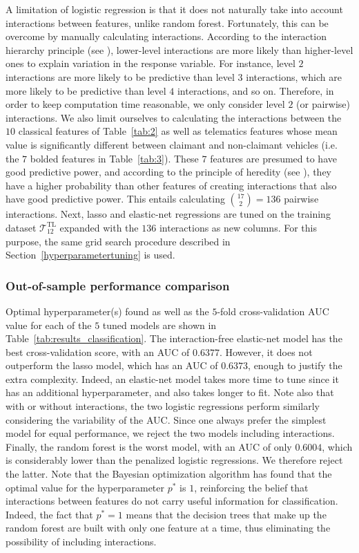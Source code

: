\documentclass{article}
\begin{document}
A limitation of logistic regression is that it does not naturally take into account interactions between features, unlike random forest. Fortunately, this can be overcome by manually calculating interactions. According to the interaction hierarchy principle (see \cite{kuhn2019feature}), lower-level interactions are more likely than higher-level ones to explain variation in the response variable. For instance, level $2$ interactions are more likely to be predictive than level $3$ interactions, which are more likely to be predictive than level $4$ interactions, and so on. Therefore, in order to keep computation time reasonable, we only consider level $2$ (or pairwise) interactions. We also limit ourselves to calculating the interactions between the $10$ classical features of Table~\ref{tab:2} as well as telematics features whose mean value is significantly different between claimant and non-claimant vehicles (i.e. the $7$ bolded features in Table~\ref{tab:3}). These $7$ features are presumed to have good predictive power, and according to the principle of heredity (see \cite{kuhn2019feature}), they have a higher probability than other features of creating interactions that also have good predictive power. This entails calculating $\binom{17}{2} = 136$ pairwise interactions. Next, lasso and elastic-net regressions are tuned on the training dataset $\mathcal{T}_{12}^\text{TL}$ expanded with the $136$ interactions as new columns. For this purpose, the same grid search procedure described in Section~\ref{hyperparametertuning} is used.

\subsubsection{Out-of-sample performance comparison}

Optimal hyperparameter(s) found as well as the $5$-fold cross-validation AUC value for each of the $5$ tuned models are shown in Table~\ref{tab:results_classification}. The interaction-free elastic-net model has the best cross-validation score, with an AUC of $0.6377$. However, it does not outperform the lasso model, which has an AUC of $0.6373$, enough to justify the extra complexity. Indeed, an elastic-net model takes more time to tune since it has an additional hyperparameter, and also takes longer to fit. Note also that with or without interactions, the two logistic regressions perform similarly considering the variability of the AUC. Since one always prefer the simplest model for equal performance, we reject the two models including interactions. Finally, the random forest is the worst model, with an AUC of only $0.6004$, which is considerably lower than the penalized logistic regressions. We therefore reject the latter. Note that the Bayesian optimization algorithm has found that the optimal value for the hyperparameter $p^*$ is $1$, reinforcing the belief that interactions between features do not carry useful information for classification. Indeed, the fact that $p^* = 1$ means that the decision trees that make up the random forest are built with only one feature at a time, thus eliminating the possibility of including interactions.
\end{document}
